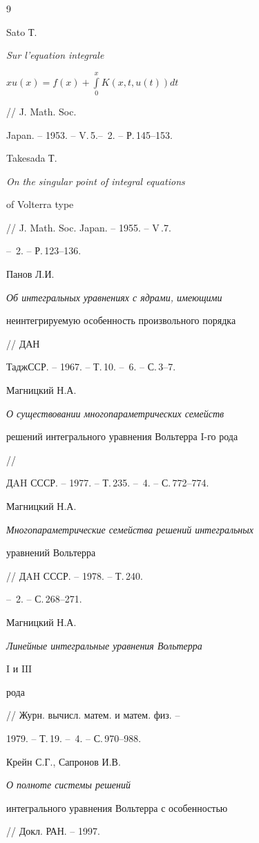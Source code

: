  


 


\begin{thebibliography}{9} 


 




Sato Т. {\em Sur l'equation integrale


$xu(x)=f(x)+\int\limits^x_0 K(x,t,u(t))dt$} // J. Math. Soc. 


Japan. -- 1953. -- V.\,5.-- \No\,2. -- Р.\,145--153. 




Takesada Т. {\em On the singular point of integral equations 


of Volterra type} // J. Math. Soc. Japan. -- 1955. -- V\,.7. 


-- \No\,2. -- Р.\,123--136. 




Панов Л.И. {\em Об интегральных уравнениях с ядрами, имеющими 


неинтегрируемую особенность произвольного порядка} // ДАН 


ТаджССР. -- 1967. -- Т.\,10. -- \No\,6. -- С.\,3--7. 




Магницкий Н.А. {\em О существовании многопараметрических семейств 


решений интегрального уравнения Вольтерра $\mathrm I$-го рода} // 


ДAH СССР. -- 1977. -- Т.\,235. -- \No\,4. -- С.\,772--774. 




Магницкий Н.А. {\em Многопараметрические семейства решений интегральных 


уравнений Вольтерра} // ДAH СССР. -- 1978. -- Т.\,240. 


-- \No\,2. -- С.\,268--271. 




Магницкий Н.А. {\em Линейные интегральные уравнения Вольтерра 


$\mathrm I$ и $\mathrm{III}$ 


рода} // Журн. вычисл. матем. и матем. физ. -- 


1979. -- Т.\,19. -- \No\,4. -- С.\,970--988. 




Крейн С.Г., Сапронов И.В. {\em О полноте системы решений 


интегрального уравнения Вольтерра с особенностью} // Докл. РАН. -- 1997. 



\end{thebibliography}
